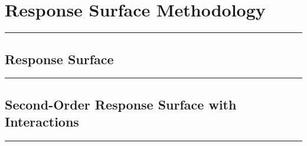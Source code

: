 \section{Response Surface Methodology}
\noindent\rule[\linienAbstand]{\linewidth}{\linienDickeDick}

\subsection{Response Surface}
\noindent\rule[\linienAbstand]{\linewidth}{\linienDicke}

\subsection{Second-Order Response Surface with Interactions}
\noindent\rule[\linienAbstand]{\linewidth}{\linienDicke}
